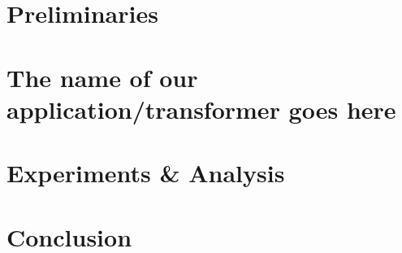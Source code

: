 \section{Preliminaries}



\section{The name of our application/transformer goes here} %



\section{Experiments \& Analysis}\label{sec:ExpRes}


\section{Conclusion}





\appendix
%

